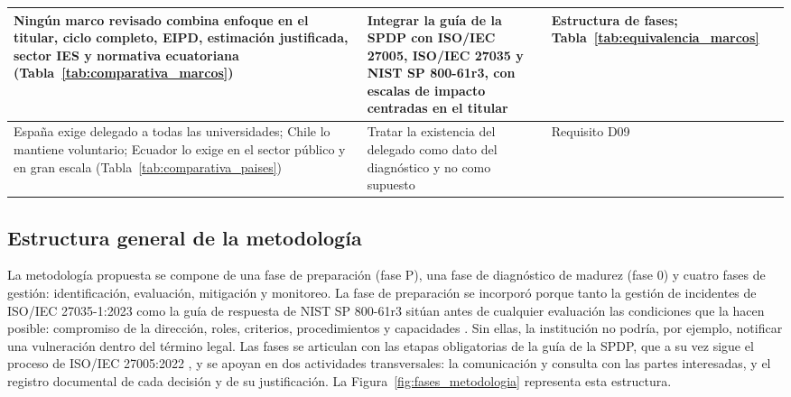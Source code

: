 \begin{table}[htbp]
\begin{tabularx}{\textwidth}{|L|L|>{\raggedright\arraybackslash}p{2.6cm}|}
    \hline
    Ningún marco revisado combina enfoque en el titular, ciclo completo, EIPD, estimación justificada, sector IES y normativa ecuatoriana (Tabla~\ref{tab:comparativa_marcos}) & Integrar la guía de la SPDP con ISO/IEC 27005, ISO/IEC 27035 y NIST SP 800-61r3, con escalas de impacto centradas en el titular & Estructura de fases; Tabla~\ref{tab:equivalencia_marcos} \\
    \hline
    España exige delegado a todas las universidades; Chile lo mantiene voluntario; Ecuador lo exige en el sector público y en gran escala (Tabla~\ref{tab:comparativa_paises}) & Tratar la existencia del delegado como dato del diagnóstico y no como supuesto & Requisito D09 \\
    \hline
  \end{tabularx}
  \raggedright
\end{table}

\subsection{Estructura general de la metodología}

La metodología propuesta se compone de una fase de preparación (fase P), una fase de diagnóstico de madurez (fase 0) y cuatro fases de gestión: identificación, evaluación, mitigación y monitoreo. La fase de preparación se incorporó porque tanto la gestión de incidentes de ISO/IEC 27035-1:2023 como la guía de respuesta de NIST SP 800-61r3 sitúan antes de cualquier evaluación las condiciones que la hacen posible: compromiso de la dirección, roles, criterios, procedimientos y capacidades \cite{iso27035_1_2023,iso27035_2_2023,nist2025sp80061r3}. Sin ellas, la institución no podría, por ejemplo, notificar una vulneración dentro del término legal. Las fases se articulan con las etapas obligatorias de la guía de la SPDP, que a su vez sigue el proceso de ISO/IEC 27005:2022 \cite{spdp2026guiav2,iso27005_2022}, y se apoyan en dos actividades transversales: la comunicación y consulta con las partes interesadas, y el registro documental de cada decisión y de su justificación. La Figura~\ref{fig:fases_metodologia} representa esta estructura.

